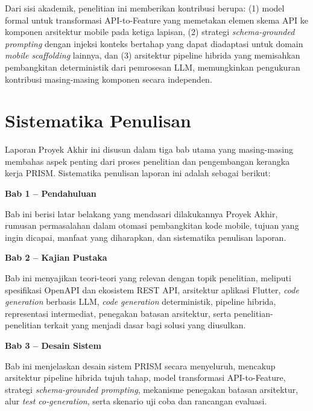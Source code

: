 Dari sisi akademik, penelitian ini memberikan kontribusi berupa: (1) model formal untuk transformasi API-to-Feature yang memetakan elemen skema API ke komponen arsitektur mobile pada ketiga lapisan, (2) strategi \textit{schema-grounded prompting} dengan injeksi konteks bertahap yang dapat diadaptasi untuk domain \textit{mobile scaffolding} lainnya, dan (3) arsitektur pipeline hibrida yang memisahkan pembangkitan deterministik dari pemrosesan LLM, memungkinkan pengukuran kontribusi masing-masing komponen secara independen.

\section{Sistematika Penulisan}

Laporan Proyek Akhir ini disusun dalam tiga bab utama yang masing-masing membahas aspek penting dari proses penelitian dan pengembangan kerangka kerja PRISM. Sistematika penulisan laporan ini adalah sebagai berikut:

\textbf{Bab 1 -- Pendahuluan}

Bab ini berisi latar belakang yang mendasari dilakukannya Proyek Akhir, rumusan permasalahan dalam otomasi pembangkitan kode mobile, tujuan yang ingin dicapai, manfaat yang diharapkan, dan sistematika penulisan laporan.

\textbf{Bab 2 -- Kajian Pustaka}

Bab ini menyajikan teori-teori yang relevan dengan topik penelitian, meliputi spesifikasi OpenAPI dan ekosistem REST API, arsitektur aplikasi Flutter, \textit{code generation} berbasis LLM, \textit{code generation} deterministik, pipeline hibrida, representasi intermediat, penegakan batasan arsitektur, serta penelitian-penelitian terkait yang menjadi dasar bagi solusi yang diusulkan.

\textbf{Bab 3 -- Desain Sistem}

Bab ini menjelaskan desain sistem PRISM secara menyeluruh, mencakup arsitektur pipeline hibrida tujuh tahap, model transformasi API-to-Feature, strategi \textit{schema-grounded prompting}, mekanisme penegakan batasan arsitektur, alur \textit{test co-generation}, serta skenario uji coba dan rancangan evaluasi.
